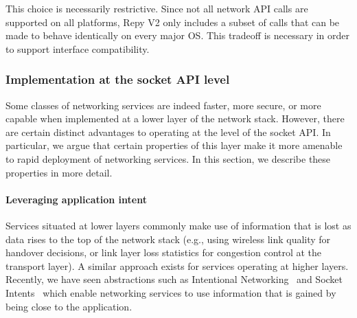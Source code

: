 This choice is necessarily restrictive. Since not all 
network API calls are supported on all platforms, 
Repy V2 only includes a subset of calls that can be 
made to behave identically on every major \ac{OS}.
This tradeoff is necessary in order to support 
interface compatibility.



\subsubsection{Implementation at the socket API level}

Some classes of networking 
services are indeed faster, more secure, or more capable when implemented 
at a lower layer of the network stack. 
However, there are certain distinct advantages to 
operating at the level of the socket API.
In particular, we argue that certain properties of 
this layer make it more amenable to rapid deployment
of networking services. In this section, we 
describe these properties in more detail.

\paragraph{Leveraging application intent}
\label{subsubsec-intent}
Services situated at lower layers 
commonly make use of information that is lost
as data rises to the top of the network stack (e.g., 
using wireless link quality for handover decisions, 
or link layer loss statistics for congestion control 
at the transport layer).
A similar approach exists for
services operating at higher layers.
Recently, we have seen abstractions such as 
Intentional Networking~\cite{higgins_intentional_2010}
and Socket Intents~\cite{socketintents_2013} 
which enable networking services to use information 
that is gained by being close to the application.

